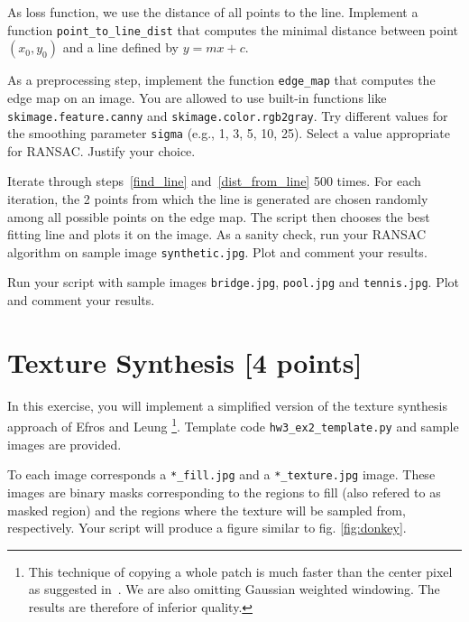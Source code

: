 \documentclass[12pt]{article}
\begin{document}
\begin{question}
\label{dist_from_line}
As loss function, we use the distance of all points to the line. Implement a function \texttt{point\_to\_line\_dist} that computes the minimal distance between point $(x_0,y_0)$ and a line defined by $y=mx+c$.
\end{question}

\begin{question}
As a preprocessing step, implement the function \texttt{edge\_map} that computes the edge map on an image. You are allowed to use built-in functions like \texttt{skimage.feature.canny} and \texttt{skimage.color.rgb2gray}. Try different values for the smoothing parameter \texttt{sigma} (e.g., 1, 3, 5, 10, 25). Select a value appropriate for RANSAC. Justify your choice.
\end{question}

\begin{question}
  Iterate through steps~\ref{find_line} and~\ref{dist_from_line} 500 times. For each iteration, the 2 points from which the line is generated are chosen randomly among all possible points on the edge map. The script then chooses the best fitting line and plots it on the image. As a sanity check, run your RANSAC algorithm on sample image \texttt{synthetic.jpg}. Plot and comment your results.
\end{question}

\begin{question}
  Run your script with sample images \texttt{bridge.jpg}, \texttt{pool.jpg} and \texttt{tennis.jpg}. Plot and comment your results.
\end{question}

\section{Texture Synthesis [4 points]}

In this exercise, you will implement a simplified version of the texture synthesis approach of Efros and Leung
\footnote{This technique of copying a whole patch is much faster than the center pixel as suggested in~\cite{efros99}. We are also omitting Gaussian weighted windowing. The results are therefore of inferior quality.}. 
Template code \texttt{hw3\_ex2\_template.py} and sample images are provided.

To each image corresponds a \texttt{*\_fill.jpg} and a \texttt{*\_texture.jpg} image.
These images are binary masks corresponding to the regions to fill (also refered to as masked region) and the regions where the texture will be sampled from, respectively.
Your script will produce a figure similar to fig. \ref{fig:donkey}.
\end{document}
